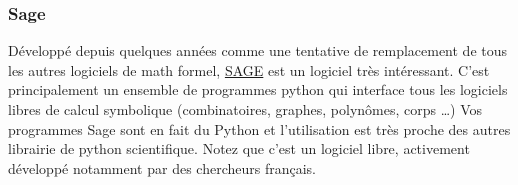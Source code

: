 \subsubsection*{Sage}
Développé depuis quelques années comme une tentative de remplacement de tous les
autres logiciels de math formel,  \href{http://www.sagemath.org/}{SAGE} est un logiciel très intéressant.
C'est principalement un ensemble de programmes python qui interface tous les logiciels
libres de calcul symbolique (combinatoires, graphes, polynômes, corps \dots)
Vos programmes Sage sont en fait du Python et l'utilisation est très proche des 
autres librairie de python scientifique.
Notez que c'est un logiciel libre, activement développé notamment par des chercheurs français.



